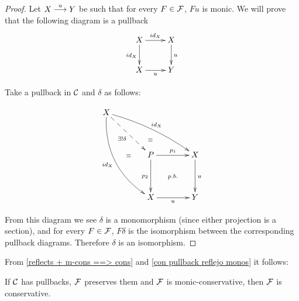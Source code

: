 \begin{proof}
Let $X \overset {u} {\longrightarrow} Y$ be such that for every $F \in \mathcal{F}$, $Fu$ is monic. We will prove that the following diagram is a pullback
\[
\xymatrix{X \ar[r]^{id_X} \ar[d]_{id_X} & X \ar[d]^u \\ X \ar[r]_u & Y}
\]

Take a pullback in $\mathcal{C}$ and $\delta$ as follows:

%
% 
$$ 
\xymatrix @+3.5ex
     { 
      X \ar@/_1.5pc/[ddr]_{id_X} 
        \ar@/^/[drr]^{id_X} 
        \ar@{-->}[dr]_{\exists! \delta} 
     & {}
   \\ 
     & P \ar@{}[dr]|{p.b.} 
         \ar@<.1ex>@{}[u]|(.36){\equiv} 
         \ar@<.1ex>@{}[l]|(.5){\equiv} 
         \ar[r]^{p_1} 
         \ar[d]_{p_2} 
      & X \ar[d]^u 
     \\ 
     & X \ar[r]_u 
     & Y
     } 
$$
 
From this diagram we see $\delta$ is a monomorphism (since either projection is a section), and for every $F \in \mathcal{F}$, $F\delta$ is the isomorphism between the corresponding pullback diagrams. Therefore $\delta$ is an isomorphism. \end{proof}

From \ref{reflects + m-cons ==> cons} and \ref{con pullback reflejo monos} it follows:
\begin{corollary}\label{pb + mc implica c}
If $\mathcal{C}$ has pullbacks, $\mathcal{F}$ preserves them and $\mathcal{F}$ is 
monic-conservative, then $\mathcal{F}$ is conservative. 
\end{corollary}






